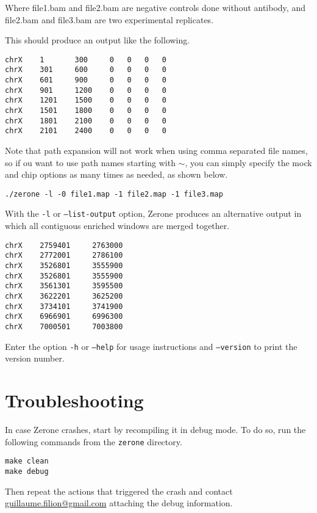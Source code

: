 \documentclass[12pt]{article}
\begin{document}
Where file1.bam and file2.bam are negative controls done without antibody,
and file2.bam and file3.bam are two experimental replicates.

This should produce an output like the following.

\begin{verbatim}
chrX    1       300     0   0   0   0
chrX    301     600     0   0   0   0
chrX    601     900     0   0   0   0
chrX    901     1200    0   0   0   0
chrX    1201    1500    0   0   0   0
chrX    1501    1800    0   0   0   0
chrX    1801    2100    0   0   0   0
chrX    2101    2400    0   0   0   0
\end{verbatim}

Note that path expansion will not work when using comma separated file names,
so if ou want to use path names starting with $\sim$, you can simply
specify the mock and chip options as many times as needed, as shown below.

\begin{verbatim}
./zerone -l -0 file1.map -1 file2.map -1 file3.map
\end{verbatim}

\pagebreak%
With the \texttt{-l} or \texttt{--list-output} option, Zerone produces an
alternative output in which all contiguous enriched windows are merged together.

\begin{verbatim}
chrX    2759401     2763000
chrX    2772001     2786100
chrX    3526801     3555900
chrX    3526801     3555900
chrX    3561301     3595500
chrX    3622201     3625200
chrX    3734101     3741900
chrX    6966901     6996300
chrX    7000501     7003800
\end{verbatim}

Enter the option \texttt{-h} or \texttt{--help} for usage instructions and
\texttt{--version} to print the version number.

\section{Troubleshooting}

In case Zerone crashes, start by recompiling it in debug mode. To do so,
run the following commands from the \texttt{zerone} directory.

\begin{verbatim}
make clean
make debug
\end{verbatim}

Then repeat the actions that triggered the crash and contact
\href{mailto:guillaume.filion@gmail.com}{guillaume.filion@gmail.com}
attaching the debug information.

\end{document}
